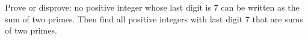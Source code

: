 Prove or disprove: no positive integer whose last digit is $7$ can be written as the sum of two primes. Then find all positive integers with last digit $7$ that are sums of two primes.
